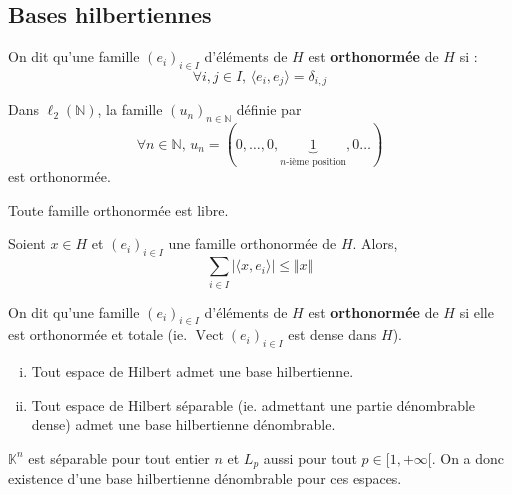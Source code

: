	\subsection{Bases hilbertiennes}
	
	
	\begin{definition}
		On dit qu'une famille $(e_i)_{i \in I}$ d'éléments de $H$ est \textbf{orthonormée} de $H$ si :
		\[ \forall i, j \in I, \, \langle e_i, e_j \rangle = \delta_{i,j} \]
	\end{definition}
	
	\begin{example}
		Dans $\ell_2(\mathbb{N})$, la famille $(u_n)_{n \in \mathbb{N}}$ définie par
		\[ \forall n \in \mathbb{N}, \, u_n = (0, \dots, 0, \underbrace{1}_{n \text{-ième position}}, 0 \dots) \]
		est orthonormée.
	\end{example}
	
	\begin{proposition}
		Toute famille orthonormée est libre.
	\end{proposition}
	
	\begin{proposition}
		Soient $x \in H$ et $(e_i)_{i \in I}$ une famille orthonormée de $H$. Alors,
		\[ \sum_{i \in I} \vert \langle x, e_i \rangle \vert \leq \Vert x \Vert \]
	\end{proposition}
	
	\begin{definition}
		On dit qu'une famille $(e_i)_{i \in I}$ d'éléments de $H$ est \textbf{orthonormée} de $H$ si elle est orthonormée et totale (ie. $\operatorname{Vect}(e_i)_{i \in I}$ est dense dans $H$).
	\end{definition}
	
	
	\begin{theorem}
		\begin{enumerate}[(i)]
			\item Tout espace de Hilbert admet une base hilbertienne.
			\item Tout espace de Hilbert séparable (ie. admettant une partie dénombrable dense) admet une base hilbertienne dénombrable.
		\end{enumerate}
	\end{theorem}
	
	\begin{example}
		$\mathbb{K}^n$ est séparable pour tout entier $n$ et $L_p$ aussi pour tout $p \in [1,+\infty[$. On a donc existence d'une base hilbertienne dénombrable pour ces espaces.
	\end{example}
	
